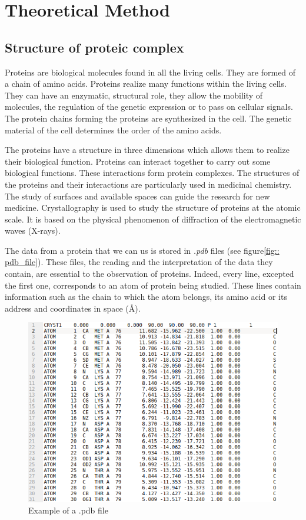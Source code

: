 \chapter{Theoretical Method}

\section{Structure of proteic complex}

Proteins are biological molecules found in all the living cells.
They are formed of a chain of amino acids.
Proteins realize many functions within the living cells.
They can have an enzymatic, structural role, they allow the mobility of molecules,
 the regulation of the genetic expression or to pass on cellular signals.
The protein chains forming the proteins are synthesized in the cell.
 The genetic material of the cell determines the order of the amino acids.

 The proteins have a structure in three dimensions which allows them
 to realize their biological function. Proteins can interact together to
 carry out some biological functions. These interactions form protein
  complexes. The structures of the proteins and their interactions are particularly used
   in medicinal chemistry.
 The study of surfaces and available spaces can guide the research for new medicine.
  Crystallography is used to study the structure of proteins at
   the atomic scale. It is based on the physical phenomenon of diffraction
    of the electromagnetic waves (X-rays).

The data from a protein that we can us is stored in \textit{.pdb} files
(see figure\ref{fig:: pdb_file}). These files, the reading and the interpretation
 of the data they contain, are essential to the observation of proteins.
 Indeed, every line, excepted the first one, corresponds to an atom of protein
 being studied.
These lines contain information such as the chain to which the atom belongs,
its amino acid or its address and coordinates in space ($\si{\angstrom}$).

\begin{figure}[ht]
  \includegraphics[width=\textwidth]{figures/pdb_example.png}
  \caption{Example of a .pdb file}
  \label{fig::pdb_file}
\end{figure}

